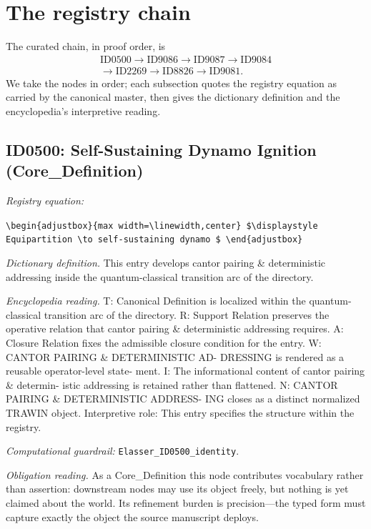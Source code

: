 \documentclass[11pt]{article}
\theoremstyle{remark}
\begin{document}
\section{The registry chain}
\label{sec:chain}

The curated chain, in proof order, is
\begin{equation*}
\begin{gathered}
\text{ID0500} \to \text{ID9086} \to \text{ID9087} \to \text{ID9084} \\
\to \text{ID2269} \to \text{ID8826} \to \text{ID9081}.
\end{gathered}
\end{equation*}
We take the nodes in order; each subsection quotes the registry equation as carried by the canonical master, then gives the dictionary definition and the encyclopedia's interpretive reading.

\subsection{ID0500: Self-Sustaining Dynamo Ignition (Core\_Definition)}

\noindent\textit{Registry equation:}\par
{\small\texttt{\textbackslash{}begin\{adjustbox\}\{max width=\textbackslash{}linewidth,center\} \$\textbackslash{}displaystyle Equipartition \textbackslash{}to self-sustaining dynamo \$ \textbackslash{}end\{adjustbox\}}}\par\medskip
\noindent\textit{Dictionary definition.} This entry develops cantor pairing \& deterministic addressing inside the quantum-classical transition arc of the directory.\par\medskip
\noindent\textit{Encyclopedia reading.} T: Canonical Definition is localized within the quantum- classical transition arc of the directory. R: Support Relation preserves the operative relation that cantor pairing \& deterministic addressing requires. A: Closure Relation fixes the admissible closure condition for the entry. W: CANTOR PAIRING \& DETERMINISTIC AD- DRESSING is rendered as a reusable operator-level state- ment. I: The informational content of cantor pairing \& determin- istic addressing is retained rather than flattened. N: CANTOR PAIRING \& DETERMINISTIC ADDRESS- ING closes as a distinct normalized TRAWIN object. Interpretive role: This entry specifies the structure within the registry.
\par\medskip\noindent\textit{Computational guardrail:} \texttt{Elasser\_ID0500\_identity}.
\par\medskip\noindent\textit{Obligation reading.} As a Core\_Definition this node contributes vocabulary rather than assertion: downstream nodes may use its object freely, but nothing is yet claimed about the world. Its refinement burden is precision---the typed form must capture exactly the object the source manuscript deploys.
\end{document}
